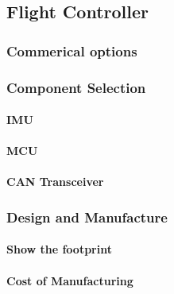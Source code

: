 \subsection{Flight Controller}

\subsubsection{Commerical options}

\subsubsection{Component Selection}
\paragraph{\gls{IMU}}
\paragraph{\gls{MCU}}
\paragraph{\gls{CAN} Transceiver}

\subsubsection{Design and Manufacture}
\paragraph{Show the footprint}
\paragraph{Cost of Manufacturing}
